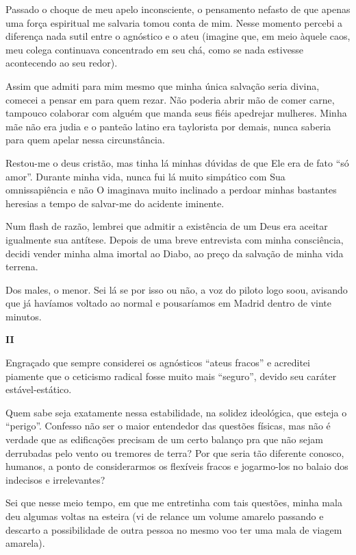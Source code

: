 Passado o choque de meu apelo inconsciente, o pensamento nefasto de que apenas uma força espiritual me salvaria tomou conta de mim. Nesse momento percebi a diferença nada sutil entre o agnóstico e o ateu (imagine que, em meio àquele caos, meu colega continuava concentrado em seu chá, como se nada estivesse acontecendo ao seu redor).

Assim que admiti para mim mesmo que minha única salvação seria divina, comecei a pensar em para quem rezar. Não poderia abrir mão de comer carne, tampouco colaborar com alguém que manda seus fiéis apedrejar mulheres. Minha mãe não era judia e o panteão latino era taylorista por demais, nunca saberia para quem apelar nessa circunstância.

Restou-me o deus cristão, mas tinha lá minhas dúvidas de que Ele era de fato ``só amor''. Durante minha vida, nunca fui lá muito simpático com Sua omnissapiência e não O imaginava muito inclinado a perdoar minhas bastantes heresias a tempo de salvar-me do acidente iminente.

Num flash de razão, lembrei que admitir a existência de um Deus era aceitar igualmente sua antítese. Depois de uma breve entrevista com minha consciência, decidi vender minha alma imortal ao Diabo, ao preço da salvação de minha vida terrena.

Dos males, o menor. Sei lá se por isso ou não, a voz do piloto logo soou, avisando que já havíamos voltado ao normal e pousaríamos em Madrid dentro de vinte minutos.

\begin{center}
{\Large \textbf{II}}
\end{center}

Engraçado que sempre considerei os agnósticos ``ateus fracos'' e acreditei piamente que o ceticismo radical fosse muito mais ``seguro'', devido seu caráter estável-estático.

Quem sabe seja exatamente nessa estabilidade, na solidez ideológica, que esteja o ``perigo''. Confesso não ser o maior entendedor das questões físicas, mas não é verdade que as edificações precisam de um certo balanço pra que não sejam derrubadas pelo vento ou tremores de terra? Por que seria tão diferente conosco, humanos, a ponto de considerarmos os flexíveis fracos e jogarmo-los no balaio dos indecisos e irrelevantes?

Sei que nesse meio tempo, em que me entretinha com tais questões, minha mala deu algumas voltas na esteira (vi de relance um volume amarelo passando e descarto a possibilidade de outra pessoa no mesmo voo ter uma mala de viagem amarela).

